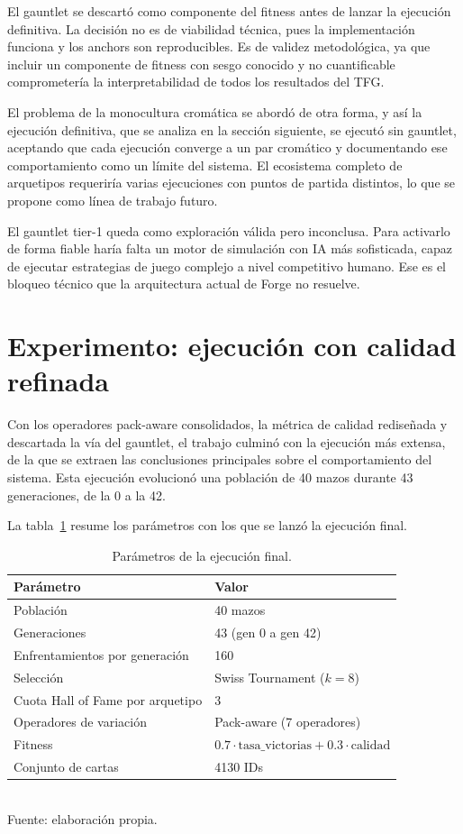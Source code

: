 El gauntlet se descartó como componente del fitness antes de lanzar la ejecución definitiva. La decisión no es de viabilidad técnica, pues la implementación funciona y los anchors son reproducibles. Es de validez metodológica, ya que incluir un componente de fitness con sesgo conocido y no cuantificable comprometería la interpretabilidad de todos los resultados del TFG.

El problema de la monocultura cromática se abordó de otra forma, y así la ejecución definitiva, que se analiza en la sección siguiente, se ejecutó sin gauntlet, aceptando que cada ejecución converge a un par cromático y documentando ese comportamiento como un límite del sistema. El ecosistema completo de arquetipos requeriría varias ejecuciones con puntos de partida distintos, lo que se propone como línea de trabajo futuro.

El gauntlet tier-1 queda como exploración válida pero inconclusa. Para activarlo de forma fiable haría falta un motor de simulación con IA más sofisticada, capaz de ejecutar estrategias de juego complejo a nivel competitivo humano. Ese es el bloqueo técnico que la arquitectura actual de Forge no resuelve.

\section{Experimento: ejecución con calidad refinada}
\label{sec:run-final}

Con los operadores pack-aware consolidados, la métrica de calidad rediseñada y descartada la vía del gauntlet, el trabajo culminó con la ejecución más extensa, de la que se extraen las conclusiones principales sobre el comportamiento del sistema. Esta ejecución evolucionó una población de 40 mazos durante 43 generaciones, de la 0 a la 42.

La tabla~\ref{tab:config-final} resume los parámetros con los que se lanzó la ejecución final.

\begin{table}[H]
\centering
\caption{Parámetros de la ejecución final.}
\label{tab:config-final}
\begin{tabular}{ll}
\toprule
\textbf{Parámetro} & \textbf{Valor} \\
\midrule
Población & 40 mazos \\
Generaciones & 43 (gen 0 a gen 42) \\
Enfrentamientos por generación & 160 \\
Selección & Swiss Tournament ($k=8$) \\
Cuota Hall of Fame por arquetipo & 3 \\
Operadores de variación & Pack-aware (7 operadores) \\
Fitness & $0.7 \cdot \text{tasa\_victorias} + 0.3 \cdot \text{calidad}$ \\
Conjunto de cartas & 4130 IDs \\
\bottomrule
\end{tabular}
\\[2pt]{\footnotesize Fuente: elaboración propia.}
\end{table}


